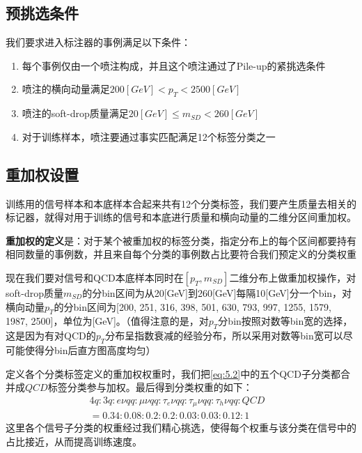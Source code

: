 \subsection{预挑选条件}
我们要求进入标注器的事例满足以下条件：
\begin{enumerate}
    \item 每个事例仅由一个喷注构成，并且这个喷注通过了Pile-up的紧挑选条件
    \item 喷注的横向动量满足$200[\si{GeV}]<p_T<2500[\si{GeV}]$
    \item 喷注的soft-drop质量满足$20[\si{GeV}]\leq m_{SD}<260[\si{GeV}]$
    \item 对于训练样本，喷注要通过事实匹配满足12个标签分类之一
\end{enumerate}
\subsection{重加权设置}
训练用的信号样本和本底样本合起来共有12个分类标签，我们要产生质量去相关的标记器，就得对用于训练的信号和本底进行质量和横向动量的二维分区间重加权。

\textbf{重加权的定义}是：对于某个被重加权的标签分类，指定分布上的每个区间都要持有相同数量的事例数，并且来自每个分类的事例数占比要符合我们预定义的分类权重

现在我们要对信号和QCD本底样本同时在$[p_T,m_{SD}]$二维分布上做重加权操作，对soft-drop质量$m_{SD}$的分bin区间为从20[GeV]到260[GeV]每隔10[GeV]分一个bin，对横向动量$p_T$的分bin区间为[200, 251, 316, 398, 501, 630, 793, 997, 1255, 1579, 1987, 2500]，单位为[GeV]。（值得注意的是，对$p_T$分bin按照对数等bin宽的选择，这是因为有对QCD的$p_T$分布呈指数衰减的经验分布，所以采用对数等bin宽可以尽可能使得分bin后直方图高度均匀）

定义各个分类标签定义的重加权权重时，我们把\eqref{eq:5.2}中的五个QCD子分类都合并成$QCD$标签分类参与加权。最后得到分类权重的如下：
\begin{equation}
\begin{split}
    4q:3q:e\nu qq:\mu\nu qq:\tau_e\nu qq:\tau_\mu\nu qq:\tau_h\nu qq:QCD \\
    =0.34:0.08:0.2:0.2:0.03:0.03:0.12:1 &
\end{split}
\end{equation}
这里各个信号子分类的权重经过我们精心挑选，使得每个权重与该分类在信号中的占比接近，从而提高训练速度。

